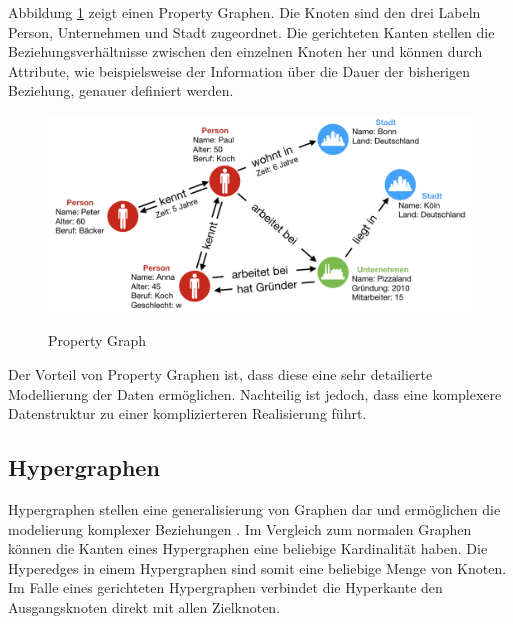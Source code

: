 Abbildung \ref{fig:property} zeigt einen Property Graphen.
Die Knoten sind den drei Labeln Person, Unternehmen und Stadt zugeordnet.
Die gerichteten Kanten stellen die Beziehungsverhältnisse zwischen den einzelnen Knoten her und können durch Attribute, wie beispielsweise der Information über die Dauer der bisherigen Beziehung, genauer definiert werden.
\begin{figure}[H]
\begin{center}
	\includegraphics[scale = 0.65]{./images/Property_graph.png}
	\label{fig:property}
	\caption{Property Graph}
\end{center}
\end{figure}

Der Vorteil von Property Graphen ist, dass diese eine sehr detailierte Modellierung der Daten ermöglichen.
Nachteilig ist jedoch, dass eine komplexere Datenstruktur zu einer komplizierteren Realisierung führt.

\subsection{Hypergraphen}
Hypergraphen stellen eine generalisierung von Graphen dar und ermöglichen die modelierung komplexer Beziehungen \cite{anglesintro}.
Im Vergleich zum normalen Graphen können die Kanten eines Hypergraphen eine beliebige Kardinalität haben.
Die Hyperedges in einem Hypergraphen sind somit eine beliebige Menge von Knoten.
Im Falle eines gerichteten Hypergraphen verbindet die Hyperkante den Ausgangsknoten direkt mit allen Zielknoten.

